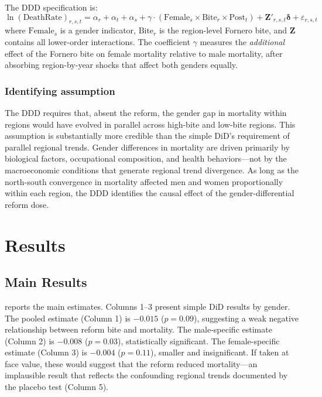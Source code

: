 \documentclass[12pt]{article}
\begin{document}
The DDD specification is:
\begin{equation}
\ln(\text{DeathRate})_{r,s,t} = \alpha_r + \alpha_t + \alpha_s + \gamma \cdot (\text{Female}_s \times \text{Bite}_r \times \text{Post}_t) + \mathbf{Z}'_{r,s,t}\boldsymbol{\delta} + \varepsilon_{r,s,t}
\label{eq:ddd}
\end{equation}
where $\text{Female}_s$ is a gender indicator, $\text{Bite}_r$ is the region-level Fornero bite, and $\mathbf{Z}$ contains all lower-order interactions. The coefficient $\gamma$ measures the \textit{additional} effect of the Fornero bite on female mortality relative to male mortality, after absorbing region-by-year shocks that affect both genders equally.

\subsubsection*{Identifying assumption} The DDD requires that, absent the reform, the gender gap in mortality within regions would have evolved in parallel across high-bite and low-bite regions. This assumption is substantially more credible than the simple DiD's requirement of parallel regional trends. Gender differences in mortality are driven primarily by biological factors, occupational composition, and health behaviors---not by the macroeconomic conditions that generate regional trend divergence. As long as the north-south convergence in mortality affected men and women proportionally within each region, the DDD identifies the causal effect of the gender-differential reform dose.

\section{Results}

\subsection{Main Results}

 reports the main estimates. Columns 1--3 present simple DiD results by gender. The pooled estimate (Column 1) is $-0.015$ ($p = 0.09$), suggesting a weak negative relationship between reform bite and mortality. The male-specific estimate (Column 2) is $-0.008$ ($p = 0.03$), statistically significant. The female-specific estimate (Column 3) is $-0.004$ ($p = 0.11$), smaller and insignificant. If taken at face value, these would suggest that the reform reduced mortality---an implausible result that reflects the confounding regional trends documented by the placebo test (Column 5).
\end{document}

